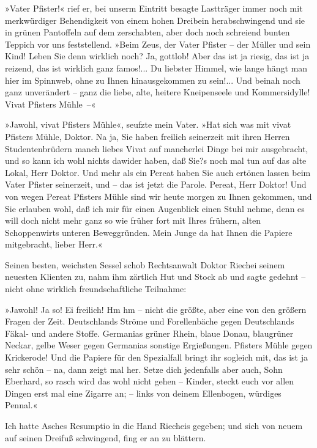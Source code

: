 »Vater Pfister!« rief er, bei unserm Eintritt besagte Lastträger
immer noch mit merkwürdiger Behendigkeit von einem hohen Dreibein
herabschwingend und sie in grünen Pantoffeln auf dem zerschabten,
aber doch noch schreiend bunten Teppich vor uns feststellend. »Beim
Zeus, der Vater Pfister – der Müller und sein Kind! Leben Sie denn
wirklich noch? Ja, gottlob! Aber das ist ja riesig, das ist ja
reizend, das ist wirklich ganz famos!... Du liebster Himmel, wie
lange hängt man hier im Spinnweb, ohne zu Ihnen hinausgekommen zu
sein!... Und beinah noch ganz unverändert – ganz die liebe, alte,
heitere Kneipenseele und Kommersidylle! Vivat Pfisters Mühle~–«

»Jawohl, vivat Pfisters Mühle«, seufzte mein Vater. »Hat sich was
mit vivat Pfisters Mühle, Doktor. Na ja, Sie haben freilich
seinerzeit mit ihren Herren Studentenbrüdern manch liebes Vivat auf
mancherlei Dinge bei mir ausgebracht, und so kann ich wohl nichts
dawider haben, daß Sie?s noch mal tun auf das alte Lokal, Herr
Doktor. Und mehr als ein Pereat haben Sie auch ertönen lassen beim
Vater Pfister seinerzeit, und – das ist jetzt die Parole. Pereat,
Herr Doktor! Und von wegen Pereat Pfisters Mühle sind wir heute
morgen zu Ihnen gekommen, und Sie erlauben wohl, daß ich mir für
einen Augenblick einen Stuhl nehme, denn es will doch nicht mehr
ganz so wie früher fort mit Ihres frühern, alten Schoppenwirts
unteren Beweggründen. Mein Junge da hat Ihnen die Papiere
mitgebracht, lieber Herr.«

Seinen besten, weichsten Sessel schob Rechtsanwalt Doktor Riechei
seinem neuesten Klienten zu, nahm ihm zärtlich Hut und Stock ab und
sagte gedehnt – nicht ohne wirklich freundschaftliche Teilnahme:

»Jawohl! Ja so! Ei freilich! Hm hm – nicht die größte, aber eine
von den größern Fragen der Zeit. Deutschlands Ströme und
Forellenbäche gegen Deutschlands Fäkal- und andere Stoffe.
Germanias grüner Rhein, blaue Donau, blaugrüner Neckar, gelbe Weser
gegen Germanias sonstige Ergießungen. Pfisters Mühle gegen
Krickerode! Und die Papiere für den Spezialfall bringt ihr sogleich
mit, das ist ja sehr schön – na, dann zeigt mal her. Setze dich
jedenfalls aber auch, Sohn Eberhard, so rasch wird das wohl nicht
gehen – Kinder, steckt euch vor allen Dingen erst mal eine Zigarre
an; – links von deinem Ellenbogen, würdiges Pennal.«

Ich hatte Asches Resumptio in die Hand Riecheis gegeben; und sich
von neuem auf seinen Dreifuß schwingend, fing er an zu blättern.

